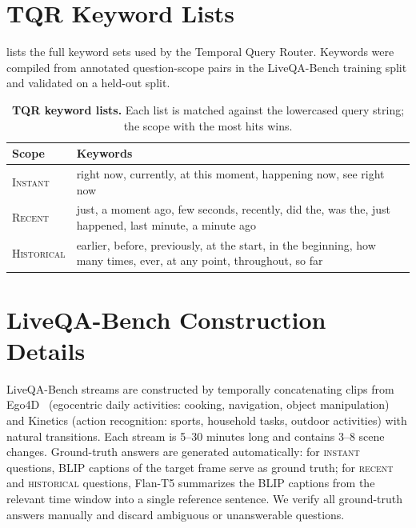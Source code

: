 \clearpage
\setcounter{page}{1}
\maketitlesupplementary

\section{TQR Keyword Lists}
\label{sec:suppl_tqr}

 lists the full keyword sets used by the Temporal Query Router. Keywords were compiled from annotated question-scope pairs in the LiveQA-Bench training split and validated on a held-out split.

\begin{table}[h]
  \caption{\textbf{TQR keyword lists.} Each list is matched against the lowercased query string; the scope with the most hits wins.}
  \label{tab:tqr_keywords}
  \centering
  \small
  \begin{tabular}{@{}lp{5.8cm}@{}}
    \toprule
    Scope & Keywords \\
    \midrule
    \textsc{Instant} & right now, currently, at this moment, happening now, see right now \\[3pt]
    \textsc{Recent} & just, a moment ago, few seconds, recently, did the, was the, just happened, last minute, a minute ago \\[3pt]
    \textsc{Historical} & earlier, before, previously, at the start, in the beginning, how many times, ever, at any point, throughout, so far \\
    \bottomrule
  \end{tabular}
\end{table}

\section{LiveQA-Bench Construction Details}
\label{sec:suppl_liveqa}

LiveQA-Bench streams are constructed by temporally concatenating clips from Ego4D~\cite{grauman2022ego4d} (egocentric daily activities: cooking, navigation, object manipulation) and Kinetics (action recognition: sports, household tasks, outdoor activities) with natural transitions.
Each stream is 5--30 minutes long and contains 3--8 scene changes.
Ground-truth answers are generated automatically: for \textsc{instant} questions, BLIP captions of the target frame serve as ground truth; for \textsc{recent} and \textsc{historical} questions, Flan-T5 summarizes the BLIP captions from the relevant time window into a single reference sentence.
We verify all ground-truth answers manually and discard ambiguous or unanswerable questions.


